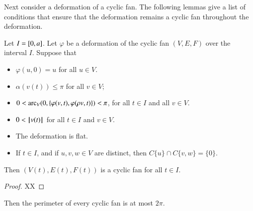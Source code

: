 Next  consider a deformation of a cyclic fan.  The following lemmas give a list of conditions that ensure that the deformation remains a cyclic fan throughout the deformation.


\begin{lemma} 
Let $I = [ 0,a]$.  Let $\varphi$ be a deformation of the cyclic fan $(V,E,F)$ over
the interval $I$.    Suppose that 
\begin{itemize}
\item $\varphi(u,0)=u$ for all $u\in V$. 
\item $\alpha(v(t))\le \pi$ for all $v\in V$;
\item $0 < \operatorname{arc}_V(0,\{\varphi(v,t),\varphi(\rho v,t)\}) < \pi$, for all $t\in I$ and all $v\in V$.
\item $0 < {{\hskip0.1em|\hskip-0.15em|\hskip0.1em}v(t){\hskip0.1em|\hskip-0.15em|\hskip0.1em}}$ for all $t\in I$ and $v\in V$.
\item The deformation is flat.
\item If $t\in I$, and if $u,v,w\in V$ are distinct, 
then $C\{u\}\cap C\{v,w\} = \{0\}$.
\end{itemize}
Then $(V(t),E(t),F(t))$ is a cyclic fan for all $t\in I$.
\end{lemma}

\begin{proof}
XX
\end{proof}






\begin{lemma}
Then the perimeter of every cyclic fan is at most $2\pi$.
\end{lemma}

